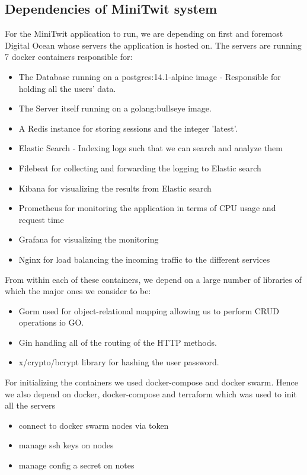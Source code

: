 \subsection{Dependencies of MiniTwit system}

For the MiniTwit application to run, we are depending on first and foremost Digital Ocean whose servers the application is 
hosted on. The servers are running 7 docker containers responsible for: 
\begin{itemize}
    \item The Database running on a postgres:14.1-alpine image - Responsible for holding all the users' data.
    \item The Server itself running on a golang:bullseye image.
    \item A Redis instance for storing sessions and the integer 'latest'.
    \item Elastic Search - Indexing logs such that we can search and analyze them
    \item Filebeat for collecting and forwarding the logging to Elastic search
    \item Kibana for visualizing the results from Elastic search
    \item Prometheus for monitoring the application in terms of CPU usage and request time
    \item Grafana for visualizing the monitoring
    \item Nginx for load balancing the incoming traffic to the different services
\end{itemize}

From within each of these containers, we depend on a large number of libraries of which the major ones we consider to be:
\begin{itemize}
    \item Gorm used for object-relational mapping allowing us to perform CRUD operations io GO.
    \item Gin handling all of the routing of the HTTP methods.
    \item x/crypto/bcrypt library for hashing the user password.
\end{itemize}

For initializing the containers we used docker-compose and docker swarm. Hence we also depend on docker, docker-compose
and terraform which was used to init all the servers
\begin{itemize}
    \item connect to docker swarm nodes via token
    \item manage ssh keys on nodes 
    \item manage config a secret on notes
\end{itemize}

